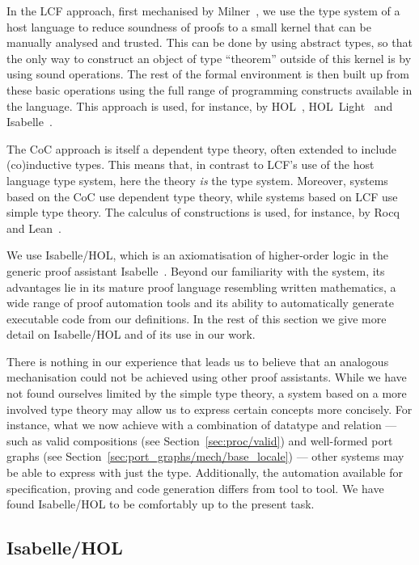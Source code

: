 \documentclass[class=smolathesis,crop=false]{standalone}
\begin{document}
In the LCF approach, first mechanised by Milner~\cite{milner-1976}, we use the type system of a host language to reduce soundness of proofs to a small kernel that can be manually analysed and trusted.
This can be done by using abstract types, so that the only way to construct an object of type ``theorem'' outside of this kernel is by using sound operations.
The rest of the formal environment is then built up from these basic operations using the full range of programming constructs available in the language.
This approach is used, for instance, by HOL~\cite{gordon_melham-1993}, HOL~Light~\cite{harrison-2009} and Isabelle~\cite{paulson-1994}.

The CoC approach is itself a dependent type theory, often extended to include (co)inductive types.
This means that, in contrast to LCF's use of the host language type system, here the theory \emph{is} the type system.
Moreover, systems based on the CoC use dependent type theory, while systems based on LCF use simple type theory.
The calculus of constructions is used, for instance, by Rocq~\cite{coq-2024} and Lean~\cite{demoura_ullrich-2021}.

We use Isabelle/HOL, which is an axiomatisation of higher-order logic in the generic proof assistant Isabelle~\cite{paulson-1994}.
Beyond our familiarity with the system, its advantages lie in its mature proof language resembling written mathematics, a wide range of proof automation tools and its ability to automatically generate executable code from our definitions.
In the rest of this section we give more detail on Isabelle/HOL and of its use in our work.

There is nothing in our experience that leads us to believe that an analogous mechanisation could not be achieved using other proof assistants.
While we have not found ourselves limited by the simple type theory, a system based on a more involved type theory may allow us to express certain concepts more concisely.
For instance, what we now achieve with a combination of datatype and relation --- such as valid compositions (see Section~\ref{sec:proc/valid}) and well-formed port graphs (see Section~\ref{sec:port_graphs/mech/base_locale}) --- other systems may be able to express with just the type.
Additionally, the automation available for specification, proving and code generation differs from tool to tool.
We have found Isabelle/HOL to be comfortably up to the present task.

\subsection{Isabelle/HOL}
\label{sec:intro/itp/isabelle}
\end{document}
